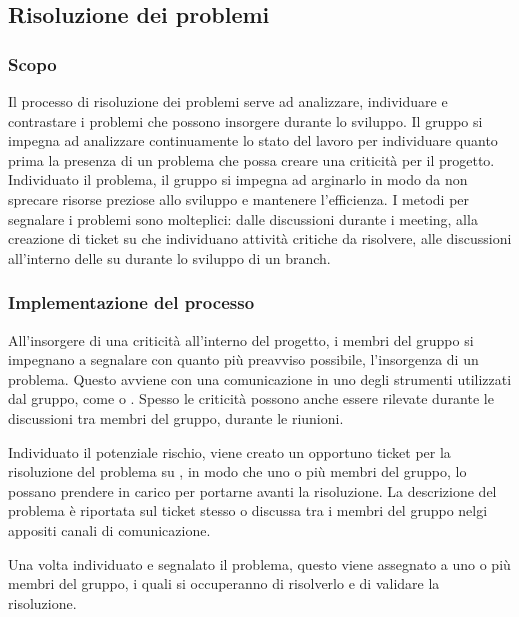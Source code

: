 \subsection{Risoluzione dei problemi}\label{risoluzione_problemi}

\subsubsection{Scopo}
\par Il processo di risoluzione dei problemi serve ad analizzare, individuare e contrastare i problemi che possono insorgere durante lo sviluppo. Il gruppo si impegna ad analizzare continuamente lo stato del lavoro per individuare quanto prima la presenza di un problema che possa creare una criticità per il progetto. Individuato il problema, il gruppo si impegna ad arginarlo in modo da non sprecare risorse preziose allo sviluppo e mantenere l'efficienza. I metodi per segnalare i problemi sono molteplici: dalle discussioni durante i meeting, alla creazione di ticket su  che individuano attività critiche da risolvere, alle discussioni all'interno delle  su  durante lo sviluppo di un branch.

\subsubsection{Implementazione del processo}
\par All'insorgere di una criticità all'interno del progetto, i membri del gruppo si impegnano a segnalare con quanto più preavviso possibile, l'insorgenza di un problema. Questo avviene con una comunicazione in uno degli strumenti utilizzati dal gruppo, come  o . Spesso le criticità possono anche essere rilevate durante le discussioni tra membri del gruppo, durante le riunioni.
\par Individuato il potenziale rischio, viene creato un opportuno ticket per la risoluzione del problema su , in modo che uno o più membri del gruppo, lo possano prendere in carico per portarne avanti la risoluzione. La descrizione del problema è riportata sul ticket stesso o discussa tra i membri del gruppo nelgi appositi canali di comunicazione. 
\par Una volta individuato e segnalato il problema, questo viene assegnato a uno o più membri del gruppo, i quali si occuperanno di risolverlo e di validare la risoluzione.

